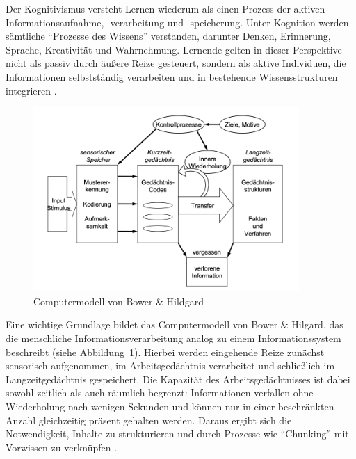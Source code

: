 Der Kognitivismus versteht Lernen wiederum als einen Prozess der aktiven Informationsaufnahme, -verarbeitung und -speicherung. Unter Kognition werden sämtliche \enquote{Prozesse des Wissens} verstanden, darunter Denken, Erinnerung, Sprache, Kreativität und Wahrnehmung. Lernende gelten in dieser Perspektive nicht als passiv durch äußere Reize gesteuert, sondern als aktive Individuen, die Informationen selbstständig verarbeiten und in bestehende Wissensstrukturen integrieren \parencite[S.~1]{furstenau_lehr-lern-theorien_2019}.

\begin{figure}[htbp]
    \centering
    \includegraphics[width=0.90\textwidth]{img/Computermodell.png}
    \caption{Computermodell von Bower \& Hildgard~\parencite[S.~234]{bower_theorie_1984}}
    \label{fig:computermodell}
\end{figure}

Eine wichtige Grundlage bildet das Computermodell von Bower \& Hilgard, das die menschliche Informationsverarbeitung analog zu einem Informationssystem beschreibt (siehe Abbildung~\ref{fig:computermodell}). Hierbei werden eingehende Reize zunächst sensorisch aufgenommen, im Arbeitsgedächtnis verarbeitet und schließlich im Langzeitgedächtnis gespeichert. Die Kapazität des Arbeitsgedächtnisses ist dabei sowohl zeitlich als auch räumlich begrenzt: Informationen verfallen ohne Wiederholung nach wenigen Sekunden und können nur in einer beschränkten Anzahl gleichzeitig präsent gehalten werden. Daraus ergibt sich die Notwendigkeit, Inhalte zu strukturieren und durch Prozesse wie \enquote{Chunking} mit Vorwissen zu verknüpfen \parencite[S.~15]{pfeiffer_simulationsumgebungen_2008}.


